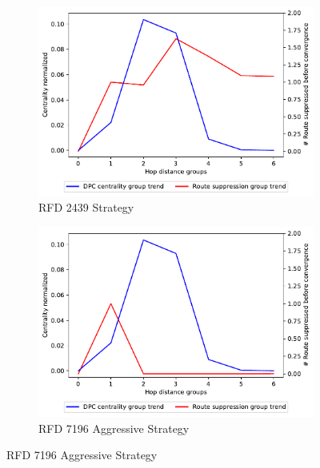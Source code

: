\begin{figure}[h]
     \centering
     \begin{subfigure}[b]{0.49\textwidth}
         \centering
         \includegraphics[width=\textwidth]{images/RFD/miceVSelephants/elephants/cisco_1000_RFD_nodeConvergence_centVSsup_trend.pdf}
         \caption{RFD 2439 Strategy}
         \label{fig:1000_2439RFD_cent_VS_sup_elephants}
     \end{subfigure}
     \hfill
     \begin{subfigure}[b]{0.49\textwidth}
         \centering
         \includegraphics[width=\textwidth]{images/RFD/miceVSelephants/elephants/cisco_1000_RFD_7196_aggressive_nodeConvergence_centVSsup_trend.pdf}
         \caption{RFD 7196 Aggressive Strategy}
         \label{fig:1000_7196RFDA_cent_VS_sup_elephants}
     \end{subfigure}

\end{figure}
